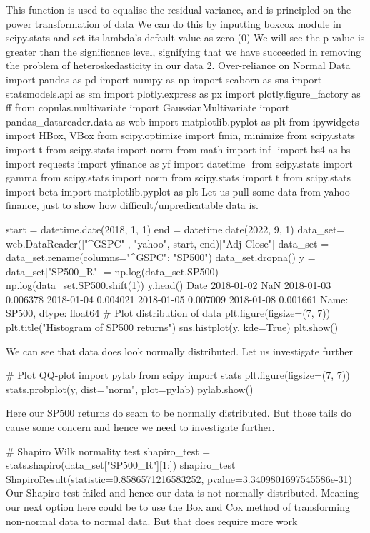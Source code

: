 This function is used to equalise the residual variance, and is principled on the power transformation of data
We can do this by inputting boxcox module in scipy.stats and set its lambda’s default value as zero (0)
We will see the p-value is greater than the significance level, signifying that we have succeeded in removing the problem of heteroskedasticity in our data
2. Over-reliance on Normal Data
import pandas as pd
import numpy as np
import seaborn as sns
import statsmodels.api as sm
import plotly.express as px
import plotly.figure_factory as ff
from copulas.multivariate import GaussianMultivariate
import pandas_datareader.data as web
import matplotlib.pyplot as plt
from ipywidgets import HBox, VBox
from scipy.optimize import fmin, minimize
from scipy.stats import t
from scipy.stats import norm
from math import inf
​
import bs4 as bs
import requests
import yfinance as yf
import datetime
​
from scipy.stats import gamma
from scipy.stats import norm
from scipy.stats import t
from scipy.stats import beta
import matplotlib.pyplot as plt
Let us pull some data from yahoo finance, just to show how difficult/unpredicatable data is.

start = datetime.date(2018, 1, 1)
end = datetime.date(2022, 9, 1)
data_set= web.DataReader(["^GSPC"], "yahoo", start, end)["Adj Close"]
data_set = data_set.rename(columns={"^GSPC": "SP500"})
data_set.dropna()
y = data_set["SP500_R"] = np.log(data_set.SP500) - np.log(data_set.SP500.shift(1))
y.head()
Date
2018-01-02         NaN
2018-01-03    0.006378
2018-01-04    0.004021
2018-01-05    0.007009
2018-01-08    0.001661
Name: SP500, dtype: float64
 # Plot distribution of data
plt.figure(figsize=(7, 7))
plt.title("Histogram of SP500 returns")
sns.histplot(y, kde=True)
plt.show()

We can see that data does look normally distributed. Let us investigate further

# Plot QQ-plot
import pylab
from scipy import stats
plt.figure(figsize=(7, 7))
stats.probplot(y, dist="norm", plot=pylab)
pylab.show()

Here our SP500 returns do seam to be normally distributed. But those tails do cause some concern and hence we need to investigate further.

# Shapiro Wilk normality test
shapiro_test = stats.shapiro(data_set["SP500_R"][1:])
shapiro_test
ShapiroResult(statistic=0.8586571216583252, pvalue=3.3409801697545586e-31)
Our Shapiro test failed and hence our data is not normally distributed. Meaning our next option here could be to use the Box and Cox method of transforming non-normal data to normal data. But that does require more work

